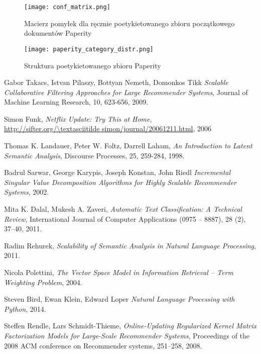 \documentclass{pracamgr}
\begin{document}
\begin{figure}[]
\centering
  \texttt{[image: conf\_matrix.png]}
  \caption{Macierz pomyłek dla ręcznie poetykietowanego zbioru początkowego dokumentów Paperity}\label{fig:paperity_confusion_matrix}
\end{figure}

\begin{figure}[]
\centering
  \texttt{[image: paperity\_category\_distr.png]}
  \caption{Struktura poetykietowanego zbioru Paperity}\label{fig:paperity_structure_labeled}
\end{figure}

\begin{thebibliography}{99}

 Gabor Takacs, Istvan Pilaszy, Bottyan Nemeth, Domonkos Tikk \textit{Scalable Collaborative Filtering Approaches for Large Recommender Systems}, Journal of Machine Learning Research, 10, 623-656, 2009.

 Simon Funk, \textit{Netflix Update: Try This at Home},\\ \url{http://sifter.org/\textasciitilde simon/journal/20061211.html}, 2006

 Thomas K. Landauer, Peter W. Foltz, Darrell Laham, \textit{An Introduction to Latent Semantic Analysis}, Discourse Processes, 25, 259-284, 1998.

 Badrul Sarwar, George Karypis, Joseph Konstan, John Riedl \textit{Incremental Singular Value Decomposition Algorithms for Highly
Scalable Recommender Systems}, 2002.

 Mita K. Dalal, Mukesh A. Zaveri, \textit{Automatic Text Classification: A Technical Review}, International Journal of Computer Applications (0975 -- 8887), 28 (2), 37--40, 2011.

 Radim Rehurek, \textit{Scalability of Semantic Analysis in Natural Language Processing}, 2011.

 Nicola Polettini, \textit{The Vector Space Model in Information Retrieval -- Term Weighting Problem}, 2004.

 Steven Bird, Ewan Klein, Edward Loper \textit{Natural Language Processing with Python}, 2014.

 Steffen Rendle, Lars Schmidt-Thieme, \textit{Online-Updating Regularized Kernel Matrix Factorization Models for Large-Scale Recommender Systems}, Proceedings of the 2008 ACM conference on Recommender systems, 251--258, 2008.


\end{thebibliography}
\end{document}
